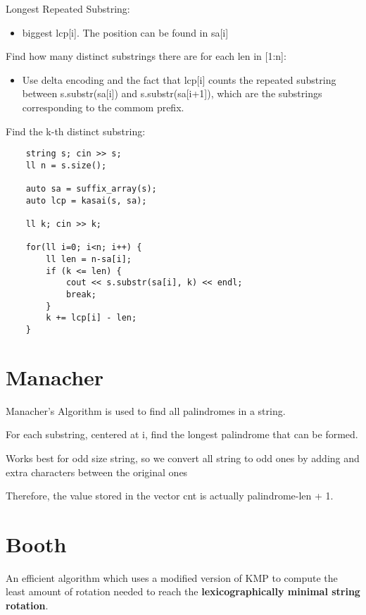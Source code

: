     Longest Repeated Substring:

    \begin{itemize}
    \item biggest lcp[i]. The position can be found in sa[i]
    \end{itemize}

    Find how many distinct substrings there are for each len in [1:n]:

    \begin{itemize}
    \item Use delta encoding and the fact that lcp[i] counts the repeated substring between s.substr(sa[i]) and s.substr(sa[i+1]), which are the substrings corresponding to the commom prefix.
    \end{itemize}
    
    Find the k-th distinct substring: 

    \begin{lstlisting}
    string s; cin >> s;
    ll n = s.size();

    auto sa = suffix_array(s);
    auto lcp = kasai(s, sa);

    ll k; cin >> k;

    for(ll i=0; i<n; i++) {
        ll len = n-sa[i];
        if (k <= len) {
            cout << s.substr(sa[i], k) << endl;
            break;
        }
        k += lcp[i] - len;
    }
    \end{lstlisting}

\section{Manacher}

    Manacher's Algorithm is used to find all palindromes in a string.

    For each substring, centered at i, find the longest palindrome that can be formed.
    
    Works best for odd size string, so we convert all string to odd ones
    by adding and extra characters between the original ones

    Therefore, the value stored in the vector cnt is actually palindrome-len + 1.


\section{Booth}

    An efficient algorithm which uses a modified version of KMP to compute the
    least amount of rotation needed to reach the \textbf{lexicographically minimal string rotation}.

